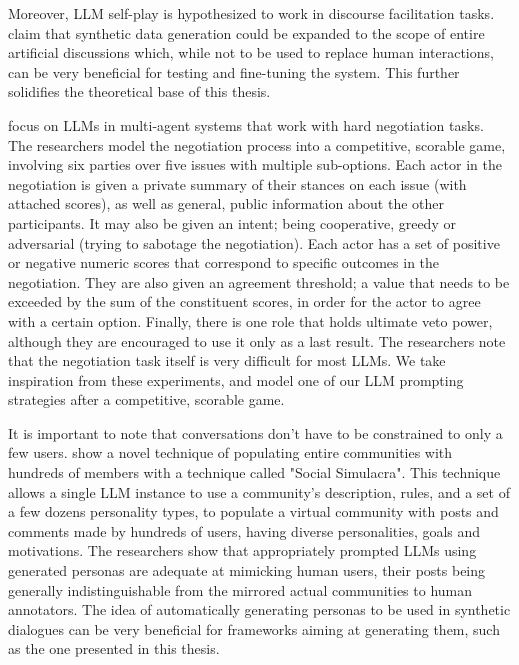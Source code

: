 Moreover, LLM self-play is hypothesized to work in discourse facilitation tasks. \citet{small-polis-llm} claim that synthetic data generation could be expanded to the scope of entire artificial discussions which, while not to be used to replace human interactions, can be very beneficial for testing and fine-tuning the system. This further solidifies the theoretical base of this thesis. 


\citet{abdelnabi2024cooperationcompetitionmaliciousnessllmstakeholders} focus on LLMs in multi-agent systems that work with hard negotiation tasks. The researchers model the negotiation process into a competitive, scorable game, involving six parties over five issues with multiple sub-options. Each actor in the negotiation is given a private summary of their stances on each issue (with attached scores), as well as general, public information about the other participants. It may also be given an intent; being cooperative, greedy or adversarial (trying to sabotage the negotiation). Each actor has a set of positive or negative numeric scores that correspond to specific outcomes in the negotiation. They are also given an agreement threshold; a value that needs to be exceeded by the sum of the constituent scores, in order for the actor to agree with a certain option. Finally, there is one role that holds ultimate veto power, although they are encouraged to use it only as a last result. The researchers note that the negotiation task itself is very difficult for most LLMs. We take inspiration from these experiments, and model one of our LLM prompting strategies after a competitive, scorable game.

It is important to note that conversations don't have to be constrained to only a few users. \citet{park2022socialsimulacracreatingpopulated} show a novel technique of populating entire communities with hundreds of members with a technique called "Social Simulacra". This technique allows a single LLM instance to use a community's description, rules, and a set of a few dozens personality types, to populate a virtual community with posts and comments made by hundreds of users, having diverse personalities, goals and motivations. The researchers show that appropriately prompted LLMs using generated personas are adequate at mimicking human users, their posts being generally indistinguishable from the mirrored actual communities to human annotators. The idea of automatically generating personas to be used in synthetic dialogues can be very beneficial for frameworks aiming at generating them, such as the one presented in this thesis.


